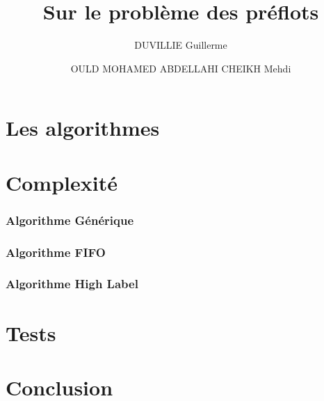 

\author{DUVILLIE Guillerme \and OULD MOHAMED ABDELLAHI CHEIKH Mehdi}
\title{Sur le problème des préflots}



\maketitle
\newpage

\tableofcontents
\newpage



\part{Les algorithmes}


\part{Complexité}
\section{Algorithme Générique}


\section{Algorithme FIFO}


\section{Algorithme High Label}


\part{Tests}


\part{Conclusion}


\newpage




